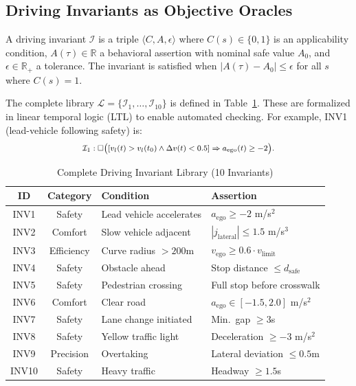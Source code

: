 \documentclass[journal]{IEEEtran}
\theoremstyle{plain}
\newcommand{\fwleq}[1]{\begin{equation}\medmath{#1}\end{equation}}
\newcommand{\invlib}{\mathcal{L}}
\newcommand{\R}{\mathbb{R}}
\begin{document}
\subsection{Driving Invariants as Objective Oracles}

A driving invariant $\mathcal{I}$ is a triple $\langle C, A, \epsilon \rangle$ where $C(s) \in \{0,1\}$ is an applicability condition, $A(\tau) \in \R$ a behavioral assertion with nominal safe value $A_0$, and $\epsilon \in \R_+$ a tolerance. The invariant is satisfied when $|A(\tau) - A_0| \leq \epsilon$ for all $s$ where $C(s)=1$.

The complete library $\invlib = \{\mathcal{I}_1,\dots,\mathcal{I}_{10}\}$ is defined in Table~\ref{tab:invariants}. These are formalized in linear temporal logic (LTL) to enable automated checking. For example, INV1 (lead-vehicle following safety) is:
\fwleq{\mathcal{I}_1: \Box\big([v_l(t) > v_l(t_0) \land \Delta v(t) < 0.5] \Rightarrow a_{\text{ego}}(t) \geq -2\big).}

\begin{table}[t]
\centering\footnotesize
\caption{Complete Driving Invariant Library (10 Invariants)}
\label{tab:invariants}
\begin{tabular}{ccll}
\toprule
\textbf{ID} & \textbf{Category} & \textbf{Condition} & \textbf{Assertion} \\\midrule
INV1 & Safety & Lead vehicle accelerates & $a_{\text{ego}} \geq -2$ m/s$^2$ \\
INV2 & Comfort & Slow vehicle adjacent & $|j_{\text{lateral}}| \leq 1.5$ m/s$^3$ \\
INV3 & Efficiency & Curve radius $>200$m & $v_{\text{ego}} \geq 0.6\cdot v_{\text{limit}}$ \\
INV4 & Safety & Obstacle ahead & Stop distance $\leq d_{\text{safe}}$ \\
INV5 & Safety & Pedestrian crossing & Full stop before crosswalk \\
INV6 & Comfort & Clear road & $a_{\text{ego}} \in [-1.5,2.0]$ m/s$^2$ \\
INV7 & Safety & Lane change initiated & Min.\ gap $\geq 3$s \\
INV8 & Safety & Yellow traffic light & Deceleration $\geq -3$ m/s$^2$ \\
INV9 & Precision & Overtaking & Lateral deviation $\leq 0.5$m \\
INV10 & Safety & Heavy traffic & Headway $\geq 1.5$s \\
\bottomrule
\end{tabular}
\end{table}
\end{document}

